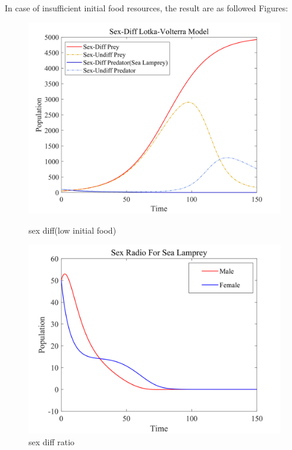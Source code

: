 \documentclass[12pt]{article}  %
\begin{document}
In case of insufficient initial food resources, the result are as followed Figures:
\begin{figure}[htbp]
	\begin{minipage}[b]{0.5\linewidth}
		\centering
		\includegraphics[width=\linewidth]{img/diff22.png}
		\caption{sex diff(low initial food)}
	\end{minipage}%
	\begin{minipage}[b]{0.5\linewidth}
		\centering
		\includegraphics[width=\linewidth]{img/diff21-17071474468901.png}
		\caption{sex diff ratio}
	\end{minipage}
\end{figure}
\end{document}
